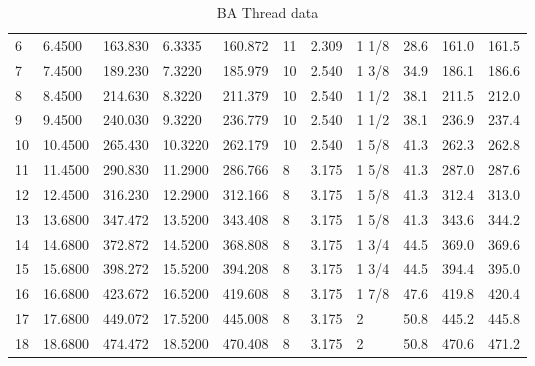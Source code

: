 \begin{table}[h!]
\begin{longtable}{l|ll|ll|ll|ll|ll}
         6&    6.4500&   163.830&    6.3335&   160.872&        11&     2.309&     1 1/8&      28.6&     161.0&     161.5\\
         7&    7.4500&   189.230&    7.3220&   185.979&        10&     2.540&     1 3/8&      34.9&     186.1&     186.6\\
         8&    8.4500&   214.630&    8.3220&   211.379&        10&     2.540&     1 1/2&      38.1&     211.5&     212.0\\
         9&    9.4500&   240.030&    9.3220&   236.779&        10&     2.540&     1 1/2&      38.1&     236.9&     237.4\\
        10&   10.4500&   265.430&   10.3220&   262.179&        10&     2.540&     1 5/8&      41.3&     262.3&     262.8\\
        11&   11.4500&   290.830&   11.2900&   286.766&         8&     3.175&     1 5/8&      41.3&     287.0&     287.6\\
        12&   12.4500&   316.230&   12.2900&   312.166&         8&     3.175&     1 5/8&      41.3&     312.4&     313.0\\
        13&   13.6800&   347.472&   13.5200&   343.408&         8&     3.175&     1 5/8&      41.3&     343.6&     344.2\\
        14&   14.6800&   372.872&   14.5200&   368.808&         8&     3.175&     1 3/4&      44.5&     369.0&     369.6\\
        15&   15.6800&   398.272&   15.5200&   394.208&         8&     3.175&     1 3/4&      44.5&     394.4&     395.0\\
        16&   16.6800&   423.672&   16.5200&   419.608&         8&     3.175&     1 7/8&      47.6&     419.8&     420.4\\
        17&   17.6800&   449.072&   17.5200&   445.008&         8&     3.175&         2&      50.8&     445.2&     445.8\\
        18&   18.6800&   474.472&   18.5200&   470.408&         8&     3.175&         2&      50.8&     470.6&     471.2\\
\end{longtable}
\caption{BA Thread data}
\end{table}
\clearpage
